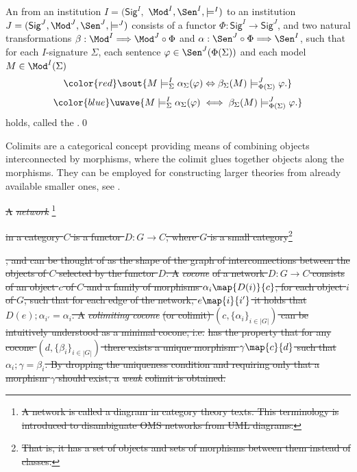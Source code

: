 \documentclass[10pt,fleqn,final]{scrreprt}
\newcommand{\Sig}{\mathsf{Sig}}
\providecommand{\DIFadd}[1]{{\protect\color{blue}\uwave{#1}}} %
\providecommand{\DIFdel}[1]{{\protect\color{red}\sout{#1}}}                      %
\providecommand{\DIFaddbegin}{} %
\providecommand{\DIFaddend}{} %
\providecommand{\DIFdelbegin}{} %
\providecommand{\DIFdelend}{} %
\begin{document}
\begin{definition} 
An  from an institution $I = (\Sig^I,$ $ \Mod^I, \Sen^I, \models^I)$ to
an institution $J = (\Sig^J, \Mod^J,
\Sen^J, \models^J)$ consists of a functor $\Phi : \Sig^I \longrightarrow \Sig^J$, and two
natural transformations \DIFdelbegin \DIFdel{$\beta: \Mod^I \Longrightarrow \Mod^J \circ \Phi$
}\DIFdelend \DIFaddbegin \DIFadd{$\beta: \Mod^I \Longrightarrow \Mod^J \circ \Phi^{op}$
}\DIFaddend and $\alpha:  \Sen^J \circ \Phi \Longrightarrow \Sen^I $, such that for each $I$-signature $\Sigma$, each sentence $\varphi\in\Sen^J(\Phi(\Sigma))$ and each model $M\in\Mod^I(\Sigma)$
\DIFdelbegin \begin{displaymath}\DIFdel{ M\models^{I}_{\Sigma}\alpha_{\Sigma}(\varphi) \Leftrightarrow
\beta_{\Sigma}(M)\models^J_{\Phi(\Sigma)}\varphi.
}\end{displaymath}
\DIFdelend %
\DIFaddbegin \begin{equation*}\DIFadd{
  M\models^{I}_{\Sigma}\alpha_{\Sigma}(\varphi)
\iff
  \beta_{\Sigma}(M)\models^J_{\Phi(\Sigma)}\varphi.
}\end{equation*}
\DIFaddend holds, called the .\DIFaddbegin \quad\DIFaddend \qed
\end{definition}

Colimits are a categorical concept providing means of
combining objects interconnected by morphisms, where the colimit
glues together objects along the morphisms.
They can be employed for constructing larger theories from already available 
smaller ones, see \cite{GoguenBurstall92}. \DIFdelbegin %

\DIFdel{A }\emph{\DIFdel{network}}%
\footnote{\DIFdel{A network is called a diagram in category theory texts. This terminology is introduced to disambiguate OMS networks
from UML diagrams.}} %
\addtocounter{footnote}{-1}%
\DIFdel{in a category $C$ is 
a functor $D:G\to C$, where $G$ is a small category}\footnote{\DIFdel{That is, it has a set of objects and sets of morphisms between them
instead of classes.}}%
\addtocounter{footnote}{-1}%
\DIFdel{, and can be thought of as the shape of the graph of
interconnections between the objects of $C$ selected by the functor $D$. A }\emph{\DIFdel{cocone}} %
\DIFdel{of
a network $D:G\to C$ consists of an object $c$ of $C$ and a family of
morphisms $\alpha_i\map{D(i)}{c}$, for each object $i$ of $G$, such that for
each edge of the network, $e\map{i}{i'}$  it holds that 
$D(e);\alpha_{i'} = \alpha_{i}$. 
A }\emph{\DIFdel{colimiting cocone}} %
\DIFdel{(or colimit) $(c, \{\alpha_i\}_{i\in|G|})$ can be
intuitively understood as a minimal cocone, i.e.}%
\DIFdel{has the property that for any 
cocone $(d, \{\beta_i\}_{i\in |G|})$ there exists a unique morphism 
$\gamma\map{c}{d}$ such that $\alpha_i;\gamma = \beta_i$. By dropping the 
uniqueness condition and requiring only that a morphism $\gamma$ should exist,
 a }\emph{\DIFdel{weak}} %
\DIFdel{colimit is obtained. 
}%
\end{document}
